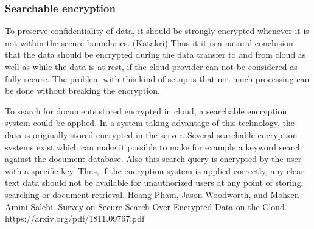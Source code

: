 \documentclass{article}
\begin{document}
\subsubsection{Searchable encryption}
To preserve confidentiality of data, it should be strongly encrypted whenever it is not within the secure boundaries. (Katakri) Thus it it is a natural conclusion that the data should be encrypted during the data transfer to and from cloud as well as while the data is at rest, if the cloud provider can not be considered as fully secure. The problem with this kind of setup is that not much processing can be done without breaking the encryption.
\par
To search for documents stored encrypted in cloud, a searchable encryption system could be applied. In a system taking advantage of this technology, the data is originally stored encrypted in the server. Several searchable encryption systems exist which can make it possible to make for example a keyword search against the document database. Also this search query is encrypted by the user with a specific key. Thus, if the encryption system is applied correctly, any clear text data should not be available for unauthorized users at any point of storing, searching or document retrieval.
Hoang Pham, Jason Woodworth, and Mohsen Amini Salehi. Survey on Secure Search Over Encrypted Data on the Cloud. https://arxiv.org/pdf/1811.09767.pdf
\end{document}
